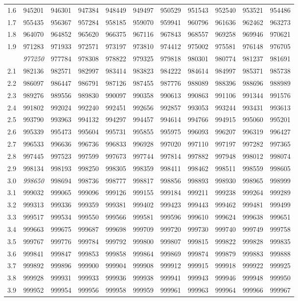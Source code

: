 \documentclass[english,ngerman,fontsize=9pt,intoc,index=totoc,refpage,listof=totoc,draft]{scrbook}
\providecommand{\tabularnewline}{\\}
\numberwithin{equation}{section}
\begin{document}
\begin{landscape}
\begin{center}
\begin{longtable}{c|ccccc|ccccc}
1.6 & 945201 & 946301 & 947384 & 948449 & 949497 & 950529 & 951543 & 952540 & 953521 & 954486\tabularnewline
\rowcolor{lightgray}
1.7 & 955435 & 956367 & 957284 & 958185 & 959070 & 959941 & 960796 & 961636 & 962462 & 963273\tabularnewline
1.8 & 964070 & 964852 & 965620 & 966375 & 967116 & 967843 & 968557 & 969258 & 969946 & 970621\tabularnewline
\rowcolor{lightgray}
1.9 & 971283 & 971933 & 972571 & 973197 & 973810 & 974412 & 975002 & 975581 & 976148 & 976705\tabularnewline
\newpage
2.0 & \emph{977250} & 977784 & 978308 & 978822 & 979325 & 979818 & 980301 & 980774 & 981237 & 981691\tabularnewline
\rowcolor{lightgray}
2.1 & 982136 & 982571 & 982997 & 983414 & 983823 & 984222 & 984614 & 984997 & 985371 & 985738\tabularnewline
2.2 & 986097 & 986447 & 986791 & 987126 & 987455 & 987776 & 988089 & 988396 & 988696 & 988989\tabularnewline
\rowcolor{lightgray}
2.3 & 989276 & 989556 & 989830 & 990097 & 990358 & 990613 & 990863 & 991106 & 991344 & 991576\tabularnewline
2.4 & 991802 & 992024 & 992240 & 992451 & 992656 & 992857 & 993053 & 993244 & 993431 & 993613\tabularnewline
\rowcolor{lightgray}
2.5 & 993790 & 993963 & 994132 & 994297 & 994457 & 994614 & 994766 & 994915 & 995060 & 995201\tabularnewline
2.6 & 995339 & 995473 & 995604 & 995731 & 995855 & 995975 & 996093 & 996207 & 996319 & 996427\tabularnewline
\rowcolor{lightgray}
2.7 & 996533 & 996636 & 996736 & 996833 & 996928 & 997020 & 997110 & 997197 & 997282 & 997365\tabularnewline
2.8 & 997445 & 997523 & 997599 & 997673 & 997744 & 997814 & 997882 & 997948 & 998012 & 998074\tabularnewline
\rowcolor{lightgray}
2.9 & 998134 & 998193 & 998250 & 998305 & 998359 & 998411 & 998462 & 998511 & 998559 & 998605\tabularnewline
3.0 & \emph{998650} & 998694 & 998736 & 998777 & 998817 & 998856 & 998893 & 998930 & 998965 & 998999\tabularnewline
\rowcolor{lightgray}
3.1 & 999032 & 999065 & 999096 & 999126 & 999155 & 999184 & 999211 & 999238 & 999264 & 999289\tabularnewline
3.2 & 999313 & 999336 & 999359 & 999381 & 999402 & 999423 & 999443 & 999462 & 999481 & 999499\tabularnewline
\rowcolor{lightgray}
3.3 & 999517 & 999534 & 999550 & 999566 & 999581 & 999596 & 999610 & 999624 & 999638 & 999651\tabularnewline
3.4 & 999663 & 999675 & 999687 & 999698 & 999709 & 999720 & 999730 & 999740 & 999749 & 999758\tabularnewline
\rowcolor{lightgray}
3.5 & 999767 & 999776 & 999784 & 999792 & 999800 & 999807 & 999815 & 999822 & 999828 & 999835\tabularnewline
3.6 & 999841 & 999847 & 999853 & 999858 & 999864 & 999869 & 999874 & 999879 & 999883 & 999888\tabularnewline
\rowcolor{lightgray}
3.7 & 999892 & 999896 & 999900 & 999904 & 999908 & 999912 & 999915 & 999918 & 999922 & 999925\tabularnewline
3.8 & 999928 & 999931 & 999933 & 999936 & 999938 & 999941 & 999943 & 999946 & 999948 & 999950\tabularnewline
\rowcolor{lightgray}
3.9 & 999952 & 999954 & 999956 & 999958 & 999959 & 999961 & 999963 & 999964 & 999966 & 999967\tabularnewline
\end{longtable}
\end{center}

\end{landscape}
\end{document}
